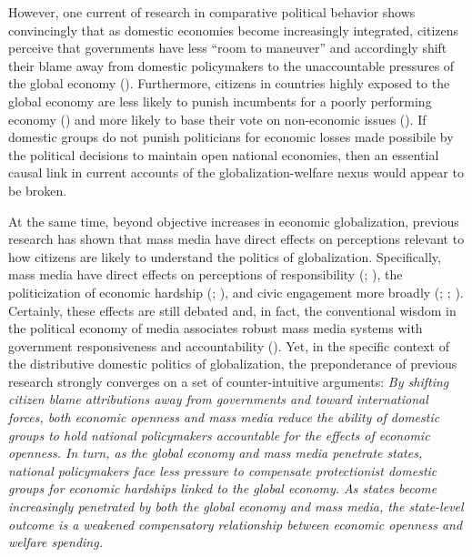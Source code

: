 \documentclass[12pt]{report}
\begin{document}
However, one current of research in comparative political behavior shows convincingly that as
domestic economies become increasingly integrated, citizens perceive that governments have less
``room to maneuver'' and accordingly shift their blame away from domestic policymakers to the
unaccountable pressures of the global economy (\citealt{Alcaniz:2010gb,Hellwig:2012vk}).
Furthermore, citizens in countries highly exposed to the global economy are less likely to punish
incumbents for a poorly performing economy (\citealt{Hellwig:2007gn}) and more likely to base their
vote on non-economic issues (\citealt{Hellwig:2008ia}). If domestic groups do not punish politicians
for economic losses made possibile by the political decisions to maintain open national economies,
then an essential causal link in current accounts of the globalization-welfare nexus would appear to
be broken.

At the same time, beyond objective increases in economic globalization, previous research has shown
that mass media have direct effects on perceptions relevant to how citizens are likely to understand
the politics of globalization. Specifically, mass media have direct effects on perceptions of
responsibility (\citealt{Iyengar:1987uo}; \citealt{Iyengar:1991uf}), the politicization of economic
hardship (\citealt{Mutz:1992ww}; \citealt{Mutz:1994kp}), and civic engagement more broadly
(\citealt{Putnam:1995vj}; \citealt{Norris:2000uf}; \citealt{Hooghe:2002bi}). Certainly, these
effects are still debated and, in fact, the conventional wisdom in the political economy of media
associates robust mass media systems with government responsiveness and accountability
(\citealt{JamesMSnyder:2012th,Besley:2002tg,Adsera:2003cc}). Yet, in the specific context of the
distributive domestic politics of globalization, the preponderance of previous research strongly
converges on a set of counter-intuitive arguments: \emph{By shifting citizen blame attributions away
from governments and toward international forces, both economic openness and mass media reduce the
ability of domestic groups to hold national policymakers accountable for the effects of economic
openness. In turn, as the global economy and mass media penetrate states, national policymakers face
less pressure to compensate protectionist domestic groups for economic hardships linked to the
global economy. As states become increasingly penetrated by both the global economy and mass media,
the state-level outcome is a weakened compensatory relationship between economic openness and
welfare spending.}
\end{document}
